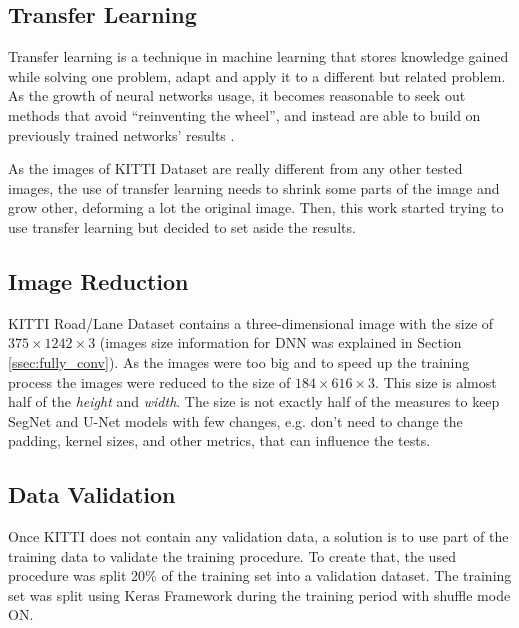 \documentclass[10pt,twocolumn,letterpaper]{article}
\begin{document}
\subsection{Transfer Learning} \label{ssec:transfer_learning}

Transfer learning is a technique in machine learning that stores knowledge gained while solving one problem, adapt and apply it to a different but related problem. As the growth of neural networks usage, it becomes reasonable to seek out methods that avoid ``reinventing the wheel'', and instead are able to build on previously trained networks' results \cite{PRATT} \cite{WEISS2016}.

As the images of KITTI Dataset are really different from any other tested images, the use of transfer learning needs to shrink some parts of the image and grow other, deforming a lot the original image. Then, this work started trying to use transfer learning but decided to set aside the results.

\subsection{Image Reduction} \label{ssec:image_reduction}

KITTI Road/Lane Dataset contains a three-dimensional image with the size of $375 \times 1242 \times 3$ (images size information for DNN was explained in Section \ref{ssec:fully_conv}). As the images were too big and to speed up the training process the images were reduced to the size of $ 184 \times 616 \times 3$. This size is almost half of the \textit{height} and \textit{width}. The size is not exactly half of the measures to keep SegNet and U-Net models with few changes, e.g. don't need to change the padding, kernel sizes, and other metrics, that can influence the tests.

\subsection{Data Validation} \label{ssec:data_validation}

Once KITTI does not contain any validation data, a solution is to use part of the training data to validate the training procedure. To create that, the used procedure was split 20\% of the training set into a validation dataset. The training set was split using Keras Framework during the training period with shuffle mode ON.
\end{document}
